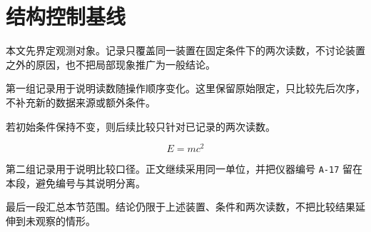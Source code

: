 \documentclass{article}
\begin{document}
\section{结构控制基线}

本文先界定观测对象。记录只覆盖同一装置在固定条件下的两次读数，不讨论装置之外的原因，也不把局部现象推广为一般结论。

第一组记录用于说明读数随操作顺序变化。这里保留原始限定，只比较先后次序，不补充新的数据来源或额外条件。

\begin{theorem}
若初始条件保持不变，则后续比较只针对已记录的两次读数。
\end{theorem}

\[
  E = mc^2
\]

第二组记录用于说明比较口径。正文继续采用同一单位，并把仪器编号 \texttt{A-17} 留在本段，避免编号与其说明分离。

最后一段汇总本节范围。结论仍限于上述装置、条件和两次读数，不把比较结果延伸到未观察的情形。
\end{document}
